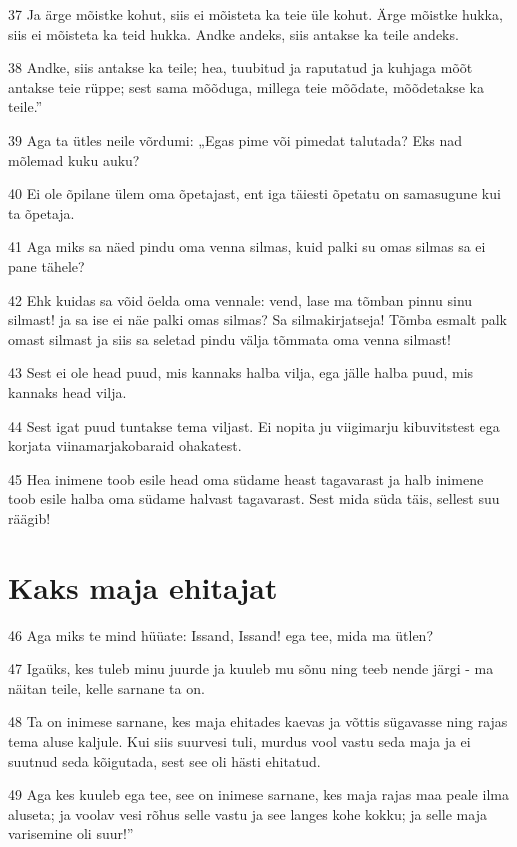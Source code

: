 \par 37 Ja ärge mõistke kohut, siis ei mõisteta ka teie üle kohut. Ärge mõistke hukka, siis ei mõisteta ka teid hukka. Andke andeks, siis antakse ka teile andeks.
\par 38 Andke, siis antakse ka teile; hea, tuubitud ja raputatud ja kuhjaga mõõt antakse teie rüppe; sest sama mõõduga, millega teie mõõdate, mõõdetakse ka teile.”
\par 39 Aga ta ütles neile võrdumi: „Egas pime või pimedat talutada? Eks nad mõlemad kuku auku?
\par 40 Ei ole õpilane ülem oma õpetajast, ent iga täiesti õpetatu on samasugune kui ta õpetaja.
\par 41 Aga miks sa näed pindu oma venna silmas, kuid palki su omas silmas sa ei pane tähele?
\par 42 Ehk kuidas sa võid öelda oma vennale: vend, lase ma tõmban pinnu sinu silmast! ja sa ise ei näe palki omas silmas? Sa silmakirjatseja! Tõmba esmalt palk omast silmast ja siis sa seletad pindu välja tõmmata oma venna silmast!
\par 43 Sest ei ole head puud, mis kannaks halba vilja, ega jälle halba puud, mis kannaks head vilja.
\par 44 Sest igat puud tuntakse tema viljast. Ei nopita ju viigimarju kibuvitstest ega korjata viinamarjakobaraid ohakatest.
\par 45 Hea inimene toob esile head oma südame heast tagavarast ja halb inimene toob esile halba oma südame halvast tagavarast. Sest mida süda täis, sellest suu räägib!

\section*{Kaks maja ehitajat}

\par 46 Aga miks te mind hüüate: Issand, Issand! ega tee, mida ma ütlen?
\par 47 Igaüks, kes tuleb minu juurde ja kuuleb mu sõnu ning teeb nende järgi - ma näitan teile, kelle sarnane ta on.
\par 48 Ta on inimese sarnane, kes maja ehitades kaevas ja võttis sügavasse ning rajas tema aluse kaljule. Kui siis suurvesi tuli, murdus vool vastu seda maja ja ei suutnud seda kõigutada, sest see oli hästi ehitatud.
\par 49 Aga kes kuuleb ega tee, see on inimese sarnane, kes maja rajas maa peale ilma aluseta; ja voolav vesi rõhus selle vastu ja see langes kohe kokku; ja selle maja varisemine oli suur!”


